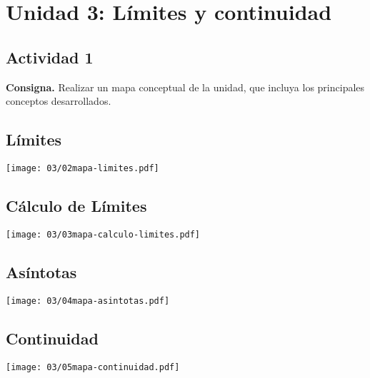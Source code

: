 \section*{Unidad 3: Límites y continuidad}

\subsection*{Actividad 1}

\textbf{Consigna.}
Realizar un mapa conceptual de la unidad, que incluya los
principales conceptos desarrollados.

\subsection*{Límites}
\begin{center}
	\texttt{[image: 03/02mapa-limites.pdf]}
\end{center}

\subsection*{Cálculo de Límites}
\begin{center}
	\texttt{[image: 03/03mapa-calculo-limites.pdf]}
\end{center}

\subsection*{Asíntotas}
\begin{center}
	\texttt{[image: 03/04mapa-asintotas.pdf]}
\end{center}

\subsection*{Continuidad}
\begin{center}
	\texttt{[image: 03/05mapa-continuidad.pdf]}
\end{center}
